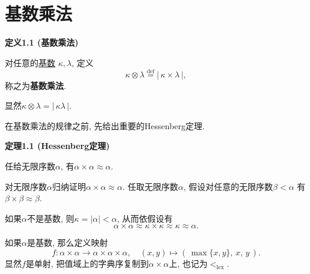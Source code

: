 \documentclass[UTF8]{ctexart}
\begin{document}
\setlength{\abovedisplayskip}{1pt}
\setlength{\belowdisplayskip}{1pt}

\section{基数乘法}

\hypertarget{sec:定义1.1}{}
\noindent\textbf{定义1.1 (基数乘法)}

对任意的\href{../01 基数/01 基数#nameddest=sec:定义1.1}{基数}
$\kappa,\lambda$, 定义
\[
    \kappa\otimes\lambda\overset{\mathrm{def}}{=}|\,\kappa\times\lambda\,|,
\]
称之为\textbf{基数乘法}.


\vspace{10pt}

显然$\kappa\otimes\lambda=|\,\kappa\lambda\,|$.

\vspace{10pt}

在基数乘法的规律之前, 先给出重要的Hessenberg定理.

\vspace{10pt}

\hypertarget{sec:定理1.1}{}
\noindent\textbf{定理1.1 (Hessenberg定理)}

任给无限序数$\alpha$, 有$\alpha\times\alpha\approx\alpha$.


对无限序数$\alpha$归纳证明$\alpha\times\alpha\approx\alpha$.
任取无限序数$\alpha$, 假设对任意的无限序数$\beta<\alpha$
有$\beta\times\beta\approx\beta$.

如果$\alpha$不是基数, 则$\kappa=|\alpha|<\alpha$, 从而依假设有
\[
    \alpha\times\alpha\approx\kappa\times\kappa\approx\kappa\approx\alpha.
\]

如果$\alpha$是基数, 那么定义映射
\[
    f:\alpha\times\alpha\to\alpha\times\alpha\times\alpha,\quad
    (x,y)\mapsto(\,\max\{x,y\},\,x,\,y\,).
\]
显然$f$是单射, 把值域上的字典序复制到$\alpha\times\alpha$上,
也记为$<_{\mathrm{lex}}$.
\end{document}
